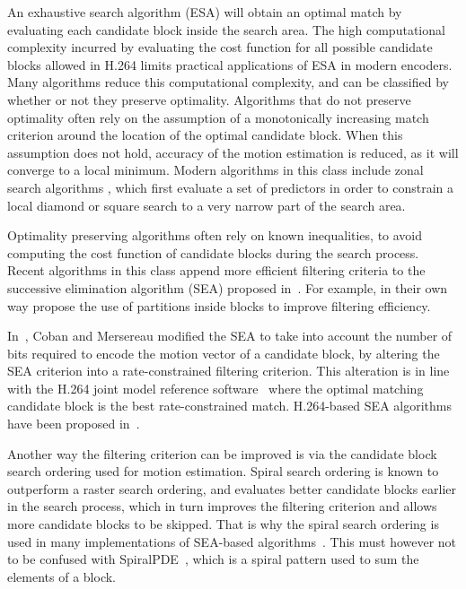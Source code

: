 \documentclass{article}
\begin{document}
An exhaustive search algorithm (ESA) will obtain an optimal match by evaluating
each candidate block inside the search area. The high computational complexity
incurred by evaluating the cost function for all possible candidate blocks
allowed in H.264 limits practical applications of ESA in modern encoders. Many
algorithms reduce this computational complexity, and can be classified by
whether or not they preserve optimality. Algorithms that do not preserve
optimality often rely on the assumption of a monotonically increasing match
criterion around the location of the optimal candidate block. When this
assumption does not hold, accuracy of the motion estimation is reduced, as it
will converge to a local minimum. Modern algorithms in this class include
zonal search algorithms \cite{Tourapis2000, Tourapis2002}, which 
first evaluate a set of predictors in order to constrain a local diamond or
square search to a very narrow part of the search area.

Optimality preserving algorithms often rely on known inequalities, to avoid
computing the cost function of candidate blocks during the search process.
Recent algorithms in this class append more efficient filtering criteria to the
successive elimination algorithm (SEA) proposed in~\cite{Li1995a}. For example,
\cite{Gao2000, Zhu2005a} in their own way propose the use of partitions inside
blocks to improve filtering efficiency.

In~\cite{Coban1998a}, Coban and Mersereau modified the SEA to take into account
the number of bits required to encode the motion vector of a candidate block, by
altering the SEA criterion into a rate-constrained filtering criterion. This
alteration is in line with the H.264 joint model reference
software~\cite{Lim2004} where the optimal matching candidate block is the best
rate-constrained match. H.264-based SEA algorithms have been proposed
in~\cite{Yang2004, Toivonen2004}.

Another way the filtering criterion can be improved is via the candidate block search
ordering used for motion estimation. Spiral search ordering is known to
outperform a raster search ordering, and evaluates better
candidate blocks earlier in the search process, which in turn improves the filtering
criterion and allows more candidate blocks to be skipped. That is why the spiral
search ordering is used in many implementations of SEA-based
algorithms~\cite{Zhu2005a, Coban1998a, Yang2004}. This must however not to be confused
with SpiralPDE~\cite{Kim2000}, which is a spiral pattern used to sum the
elements of a block.
\end{document}
